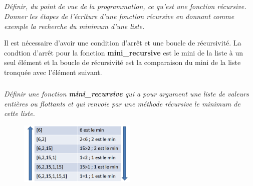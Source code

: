 \documentclass[10pt,fleqn]{article} %
\begin{document}
\ifprof
\begin{corrige}
\end{corrige}
\else
\fi
	
\subparagraph{}
\textit{Définir, du point de vue de la programmation, ce qu'est une fonction récursive. Donner les étapes de l'écriture d'une fonction récursive en donnant comme exemple la recherche du minimum d'une liste.}

\ifprof
\begin{corrige}
Il est nécessaire d'avoir une condition d'arrêt et une boucle de récursivité. La condtion d'arrêt pour la fonction \textbf{mini\_recursive} est le mini de la liste à un seul élément et la boucle de récursivité est la comparaison du mini de la liste tronquée avec l'élément suivant.
\end{corrige}
\else
\fi
	
\subparagraph{}
\textit{Définir une fonction \textbf{mini\_recursive} qui a pour argument une liste de valeurs entières ou flottants et qui renvoie par une méthode récursive le \emph{minimum} de cette liste.}

\ifprof
\begin{corrige}
\end{corrige}
\else
\fi

\ifprof
\begin{corrige}
\begin{figure}[h]
	\centering
		\includegraphics[width=0.5\textwidth]{images/recursivite.png}
\end{figure}
\end{corrige}
\else
\fi
  
\end{document}
